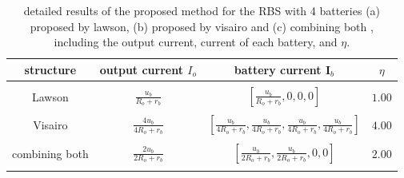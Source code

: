 \documentclass{article}
\begin{document}
\begin{table}[h]
    \centering
    \caption{
        detailed results of the proposed method for the RBS with 4 batteries (a) proposed by lawson\cite{lawsonSoftwareConfigurableBattery2012}, (b) proposed by  visairo\cite{visairoReconfigurableBatteryPack2008} and (c) combining both  , including the output current, current of each battery, and $\eta$.}
    \label{tab:d-structure}
    \begin{tabular}{cccc}
        \hline
        structure &  output current $I_o$       & battery current $\bm{I}_b$       & $\eta$        \\
        \hline\\
        Lawson\cite{lawsonSoftwareConfigurableBattery2012} &  $\displaystyle\frac{u_b}{R_o + r_b}$ &  $\displaystyle\left[\frac{u_b}{R_o + r_b},0,0,0\right]$   & $1.00$ \\
        \\
        Visairo\cite{visairoReconfigurableBatteryPack2008} &  $\displaystyle\frac{4u_b}{4R_o + r_b}$ &  $\displaystyle\left[\frac{u_b}{4R_o + r_b},\frac{u_b}{4R_o + r_b},\frac{u_b}{4R_o + r_b},\frac{u_b}{4R_o + r_b}\right]$   & $4.00$ \\
        \\
        combining both &  $\displaystyle\frac{2u_b}{2R_o + r_b}$ &  $\displaystyle\left[\frac{u_b}{2R_o + r_b},\frac{u_b}{2R_o + r_b},0,0\right]$   & $2.00$ \\
        \\
        \hline
    \end{tabular}
\end{table}
\end{document}
